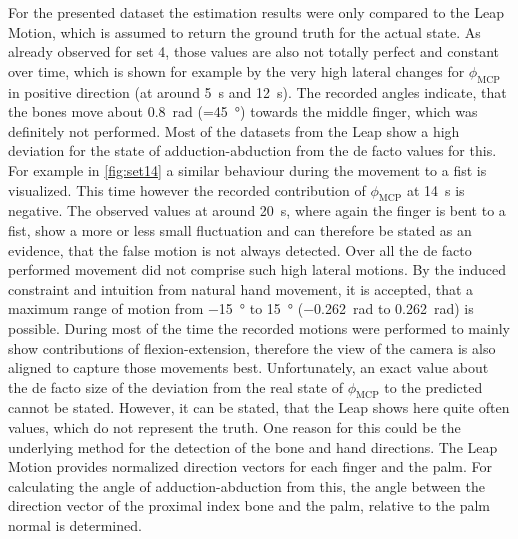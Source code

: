 For the presented dataset the estimation results were only compared to the Leap Motion, which is assumed to return the ground truth for the actual state. As already observed for set 4, those values are also not totally perfect and constant over time, which is shown for example by the very high lateral changes for $ \phi_{\mathrm{MCP}} $ in positive direction (at around \SI{5}{\second} and \SI{12}{\second}). The recorded angles indicate, that the bones move about \SI{0.8}{\radian} (=\SI{45}{\degree}) towards the middle finger, which was definitely not performed. Most of the datasets from the Leap show a high deviation for the state of adduction-abduction from the de facto values for this. For example in \ref{fig:set14} a similar behaviour during the movement to a fist is visualized. This time however the recorded contribution of $ \phi_{\mathrm{MCP}} $ at \SI{14}{\second} is negative. The observed values at around \SI{20}{\second}, where again the finger is bent to a fist, show a more or less small fluctuation and can therefore be stated as an evidence, that the false motion is not always detected. Over all the de facto performed movement did not comprise such high lateral motions. By the induced constraint and intuition from natural hand movement, it is accepted, that a maximum range of motion from \SI{-15}{\degree} to \SI{+15}{\degree} (\SI{-0.262}{\radian} to \SI{+0.262}{\radian}) is possible. During most of the time the recorded motions were performed to mainly show contributions of flexion-extension, therefore the view of the camera is also aligned to capture those movements best. Unfortunately, an exact value about the de facto size of the deviation from the real state of $ \phi_{\mathrm{MCP}} $ to the predicted cannot be stated. However, it can be stated, that the Leap shows here quite often values, which do not represent the truth. One reason for this could be the underlying method for the detection of the bone and hand directions. The Leap Motion provides normalized direction vectors for each finger and the palm. For calculating the angle of adduction-abduction from this, the angle between the direction vector of the proximal index bone and the palm, relative to the palm normal is determined.\\
\FloatBarrier
